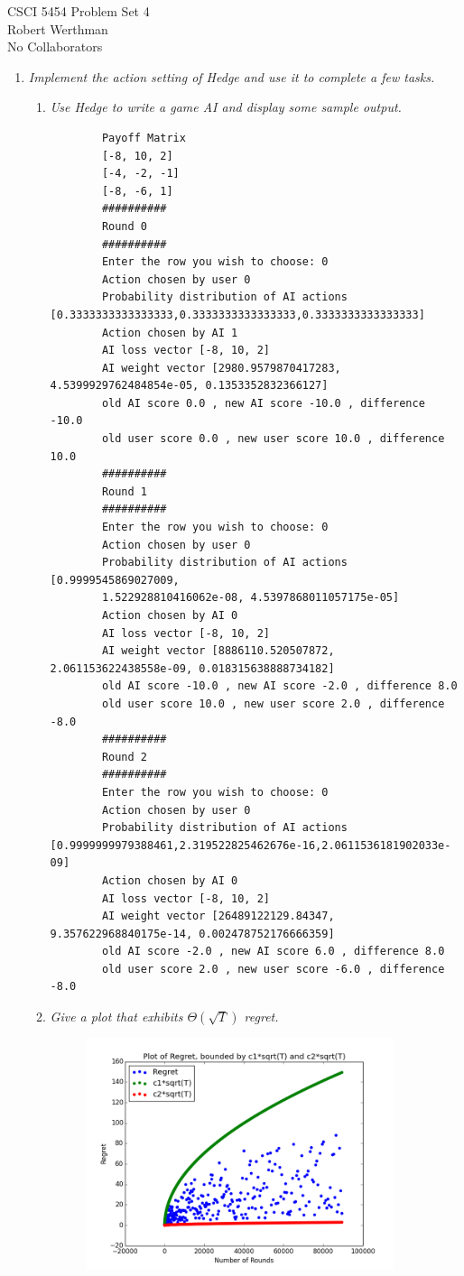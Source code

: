 \documentclass[12pt]{article}
\begin{document}
CSCI 5454 \hfill Problem Set 4\\
Robert Werthman\\
No Collaborators

\hrulefill

\begin{enumerate}
  \item \textit{Implement the action setting of Hedge and use it to complete a
  few tasks.}
  	\begin{enumerate}
  	  \item \textit{Use Hedge to write a game AI and display some sample output.}
  	    \scriptsize
  	  	\begin{verbatim}
	 	Payoff Matrix
		[-8, 10, 2]
		[-4, -2, -1]
		[-8, -6, 1]
		##########
		Round 0
		##########
		Enter the row you wish to choose: 0
		Action chosen by user 0
		Probability distribution of AI actions [0.3333333333333333,0.3333333333333333,0.3333333333333333]
		Action chosen by AI 1
		AI loss vector [-8, 10, 2]
		AI weight vector [2980.9579870417283, 4.5399929762484854e-05, 0.1353352832366127]
		old AI score 0.0 , new AI score -10.0 , difference -10.0
		old user score 0.0 , new user score 10.0 , difference 10.0
		##########
		Round 1
		##########
		Enter the row you wish to choose: 0
		Action chosen by user 0
		Probability distribution of AI actions [0.9999545869027009, 
		1.522928810416062e-08, 4.5397868011057175e-05]
		Action chosen by AI 0
		AI loss vector [-8, 10, 2]
		AI weight vector [8886110.520507872, 2.061153622438558e-09, 0.018315638888734182]
		old AI score -10.0 , new AI score -2.0 , difference 8.0
		old user score 10.0 , new user score 2.0 , difference -8.0
		##########
		Round 2
		##########
		Enter the row you wish to choose: 0
		Action chosen by user 0
		Probability distribution of AI actions [0.9999999979388461,2.319522825462676e-16,2.0611536181902033e-09]
		Action chosen by AI 0
		AI loss vector [-8, 10, 2]
		AI weight vector [26489122129.84347, 9.357622968840175e-14, 0.002478752176666359]
		old AI score -2.0 , new AI score 6.0 , difference 8.0
		old user score 2.0 , new user score -6.0 , difference -8.0
  		\end{verbatim}
  	  	\normalsize
  	  \item \textit{Give a plot that exhibits $\Theta{(\sqrt{T})}$ regret.}
  	    \begin{figure}[H]
  	    \centering
  	    \includegraphics[width=9cm]{q1b.png}

\end{figure}
\end{enumerate}
\end{enumerate}
\end{document}

